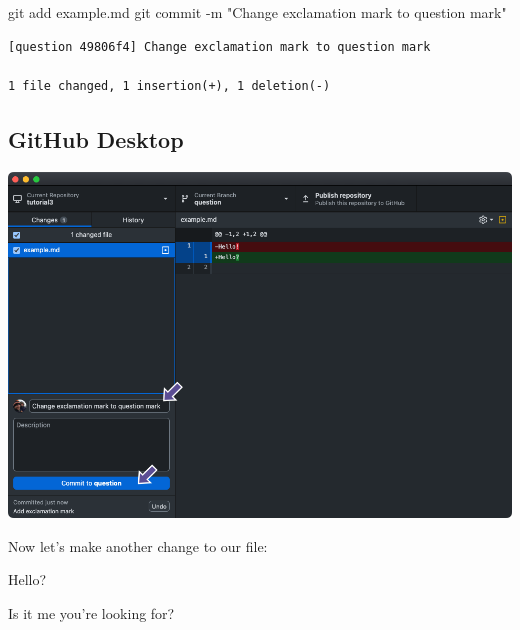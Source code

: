 \documentclass[
  letterpaper,
  DIV=11,
  numbers=noendperiod]{scrartcl}
\newenvironment{Shaded}{\begin{snugshade}}{\end{snugshade}}
\newcommand{\NormalTok}[1]{\textcolor[rgb]{0.00,0.23,0.31}{#1}}
\newcommand{\SpecialCharTok}[1]{\textcolor[rgb]{0.37,0.37,0.37}{#1}}
\newcommand{\StringTok}[1]{\textcolor[rgb]{0.13,0.47,0.30}{#1}}
\begin{document}
\begin{Shaded}
\begin{Highlighting}[]
\NormalTok{git add example.md}
\NormalTok{git commit }\SpecialCharTok{{-}}\NormalTok{m }\StringTok{"Change exclamation mark to question mark"}
\end{Highlighting}
\end{Shaded}

\begin{verbatim}
[question 49806f4] Change exclamation mark to question mark

1 file changed, 1 insertion(+), 1 deletion(-)
\end{verbatim}

\subsection{GitHub Desktop}

\includegraphics{images/image38.png}

Now let's make another change to our file:

\begin{tcolorbox}[enhanced jigsaw, opacityback=0, colframe=quarto-callout-note-color-frame, toprule=.15mm, arc=.35mm, rightrule=.15mm, title=\textcolor{quarto-callout-note-color}{\faInfo}\hspace{0.5em}{example.md}, colbacktitle=quarto-callout-note-color!10!white, left=2mm, leftrule=.75mm, opacitybacktitle=0.6, toptitle=1mm, colback=white, bottomtitle=1mm, breakable, titlerule=0mm, bottomrule=.15mm, coltitle=black]

Hello?

Is it me you're looking for?

\end{tcolorbox}
\end{document}
